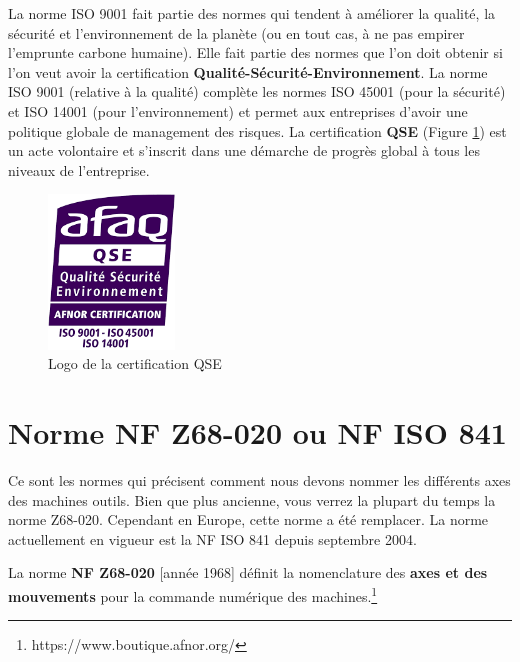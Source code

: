 \documentclass[
	11pt, %
	fleqn, %
	a4paper, %
]{LegrandOrangeBook}
\begin{document}
La norme ISO 9001 fait partie des normes qui tendent à améliorer la qualité, la sécurité et l'environnement de la planète (ou en tout cas, à ne pas empirer l'emprunte carbone humaine). Elle fait partie des normes que l'on doit obtenir si l'on veut avoir la certification \textbf{Qualité-Sécurité-Environnement}. La norme ISO 9001 (relative à la qualité) complète les normes ISO 45001 (pour la sécurité) et ISO 14001 (pour l’environnement) et permet aux entreprises d’avoir une politique globale de management des risques. La certification \textbf{QSE} (Figure \ref{logo_QSE}) est un acte volontaire et s’inscrit dans une démarche de progrès global à tous les niveaux de l’entreprise.



\begin{figure}[H] %
	\centering %
	\includegraphics[width=0.3\textwidth]{Images/Logo_QSE.png} %
	\caption{Logo de la certification QSE}
	\label{logo_QSE} %
\end{figure}




\section{Norme NF Z68-020 ou NF ISO 841}
Ce sont les normes qui précisent comment nous devons nommer les différents axes des machines outils. Bien que plus ancienne, vous verrez la plupart du temps la norme Z68-020. Cependant en Europe, cette norme a été remplacer. La norme actuellement en vigueur est la NF ISO 841 depuis septembre 2004.
\begin{definition}
La norme \textbf{NF Z68-020} [année 1968] définit la nomenclature des \textbf{axes et des mouvements} pour la commande numérique des machines.\footnote{https://www.boutique.afnor.org/}
\end{definition}
\end{document}
